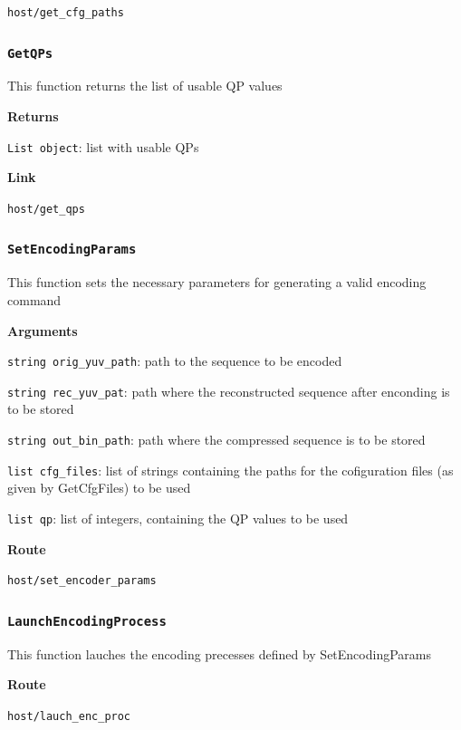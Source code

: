 \documentclass{article}
\begin{document}
\texttt{host/get_cfg_paths}


\subsubsection*{\texttt{GetQPs}}

This function returns the list of usable QP values

\textbf{Returns}

\texttt{List object}: list with usable QPs

\textbf{Link}

\texttt{host/get_qps}


\subsubsection*{\texttt{SetEncodingParams}}

This function sets the necessary parameters for generating a valid encoding command

\textbf{Arguments}

\texttt{string orig_yuv_path}: path to the sequence to be encoded

\texttt{string rec_yuv_pat}: path where the reconstructed sequence after enconding is to be stored

\texttt{string out_bin_path}: path where the compressed sequence is to be stored

\texttt{list cfg_files}: list of strings containing the paths for the cofiguration files (as given by GetCfgFiles) to be used

\texttt{list qp}: list of integers, containing the QP values to be used

\textbf{Route}

\texttt{host/set_encoder_params}


\subsubsection*{\texttt{LaunchEncodingProcess}}

This function lauches the encoding precesses defined by SetEncodingParams

\textbf{Route}

\texttt{host/lauch_enc_proc}

\end{document}
